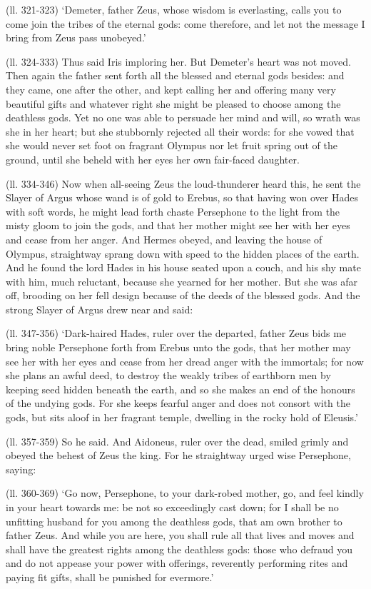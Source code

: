 (ll. 321-323) ‘Demeter, father Zeus, whose wisdom is everlasting, calls
you to come join the tribes of the eternal gods: come therefore, and let not
the message I bring from Zeus pass unobeyed.’

(ll. 324-333) Thus said Iris imploring her. But Demeter’s heart was not
moved. Then again the father sent forth all the blessed and eternal gods
besides: and they came, one after the other, and kept calling her and offering
many very beautiful gifts and whatever right she might be pleased to choose
among the deathless gods. Yet no one was able to persuade her mind and will, so
wrath was she in her heart; but she stubbornly rejected all their words: for
she vowed that she would never set foot on fragrant Olympus nor let fruit
spring out of the ground, until she beheld with her eyes her own fair-faced
daughter.

(ll. 334-346) Now when all-seeing Zeus the loud-thunderer heard this, he sent
the Slayer of Argus whose wand is of gold to Erebus, so that having won over
Hades with soft words, he might lead forth chaste Persephone to the light from
the misty gloom to join the gods, and that her mother might see her with her
eyes and cease from her anger. And Hermes obeyed, and leaving the house of
Olympus, straightway sprang down with speed to the hidden places of the earth.
And he found the lord Hades in his house seated upon a couch, and his shy mate
with him, much reluctant, because she yearned for her mother. But she was afar
off, brooding on her fell design because of the deeds of the blessed gods. And
the strong Slayer of Argus drew near and said:

(ll. 347-356) ‘Dark-haired Hades, ruler over the departed, father Zeus
bids me bring noble Persephone forth from Erebus unto the gods, that her mother
may see her with her eyes and cease from her dread anger with the immortals;
for now she plans an awful deed, to destroy the weakly tribes of earthborn men
by keeping seed hidden beneath the earth, and so she makes an end of the
honours of the undying gods. For she keeps fearful anger and does not consort
with the gods, but sits aloof in her fragrant temple, dwelling in the rocky
hold of Eleusis.’

(ll. 357-359) So he said. And Aidoneus, ruler over the dead, smiled grimly and
obeyed the behest of Zeus the king. For he straightway urged wise Persephone,
saying:

(ll. 360-369) ‘Go now, Persephone, to your dark-robed mother, go, and
feel kindly in your heart towards me: be not so exceedingly cast down; for I
shall be no unfitting husband for you among the deathless gods, that am own
brother to father Zeus. And while you are here, you shall rule all that lives
and moves and shall have the greatest rights among the deathless gods: those
who defraud you and do not appease your power with offerings, reverently
performing rites and paying fit gifts, shall be punished for evermore.’

